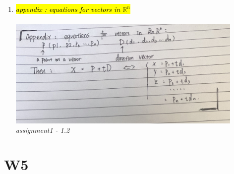 \documentclass[10pt]{article}
\begin{document}
\begin{enumerate}
\item \hl{\textit{appendix : equations for vectors in $\mathbb{R}^{n}$}}\\\\
\includegraphics[width=0.9\textwidth]{images/w4-2.jpeg}\\
\textit{assignment1 - 1.2}


\end{enumerate}



\newpage




\section{W5}
\end{document}
